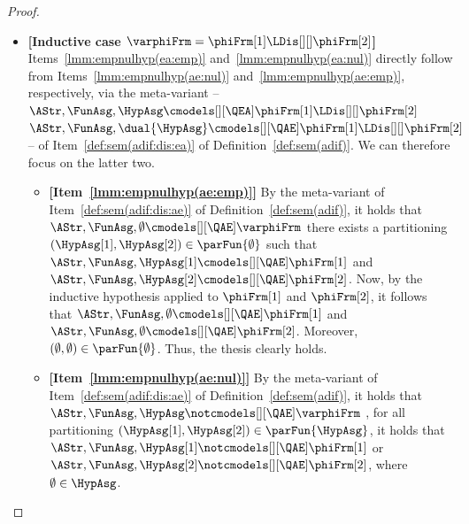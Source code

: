 \documentclass[authoryear]{elsarticle}
\newcommand{\EmpTeamAsg}{\emptyset}
\newcommand{\EmpHypAsg}{\emptyset}
\begin{document}
\begin{proof}
\begin{itemize}[$\bullet$]
    \item\textbf{[Inductive case $\varphiFrm = \phiFrm[1] \LDis[][]
        \phiFrm[2]$]} Items~\ref{lmm:empnulhyp(ea:emp)}
      and~\ref{lmm:empnulhyp(ea:nul)} directly follow from
      Items~\ref{lmm:empnulhyp(ae:nul)} and~\ref{lmm:empnulhyp(ae:emp)},
      respectively, via the meta-variant -- $\AStr, \FunAsg, \HypAsg
      \cmodels[][\QEA] \phiFrm[1] \LDis[][] \phiFrm[2]$ \iff $\AStr, \FunAsg,
      \dual{\HypAsg} \cmodels[][\QAE] \phiFrm[1] \LDis[][] \phiFrm[2]$ -- of
      Item~\ref{def:sem(adif:dis:ea)} of Definition~\ref{def:sem(adif)}.
      We can therefore focus on the latter two.
      \begin{itemize}
        \item\textbf{[Item~\ref{lmm:empnulhyp(ae:emp)}]}
          By the meta-variant of Item~\ref{def:sem(adif:dis:ae)} of
          Definition~\ref{def:sem(adif)}, it holds that $\AStr, \FunAsg,
          \EmpHypAsg \cmodels[][\QAE] \varphiFrm$ \iff there exists a partitioning
          $(\HypAsg[1], \HypAsg[2]) \in \parFun{\EmpHypAsg}$ such that
          $\AStr, \FunAsg, \HypAsg[1] \cmodels[][\QAE] \phiFrm[1]$ and $\AStr,
          \FunAsg, \HypAsg[2] \cmodels[][\QAE] \phiFrm[2]$.
          Now, by the inductive hypothesis applied to $\phiFrm[1]$ and
          $\phiFrm[2]$, it follows that $\AStr, \FunAsg, \EmpHypAsg
          \cmodels[][\QAE] \phiFrm[1]$ and $\AStr, \FunAsg, \EmpHypAsg
          \cmodels[][\QAE] \phiFrm[2]$.
          Moreover, $(\EmpHypAsg, \EmpHypAsg) \in
          \parFun{\EmpHypAsg}$.
          Thus, the thesis clearly holds.
        \item\textbf{[Item~\ref{lmm:empnulhyp(ae:nul)}]}
          By the meta-variant of Item~\ref{def:sem(adif:dis:ae)} of
          Definition~\ref{def:sem(adif)}, it holds that $\AStr, \FunAsg, \HypAsg
          \notcmodels[][\QAE] \varphiFrm$ \iff, for all partitioning $(\HypAsg[1],
          \HypAsg[2]) \in \parFun{\HypAsg}$, it holds that $\AStr,
          \FunAsg, \HypAsg[1] \notcmodels[][\QAE] \phiFrm[1]$ or ${\AStr,
          \FunAsg, \HypAsg[2] \notcmodels[][\QAE] \phiFrm[2]}$, where
          $\EmpTeamAsg \in \HypAsg$.

\end{itemize}
\end{itemize}
\end{proof}
\end{document}

